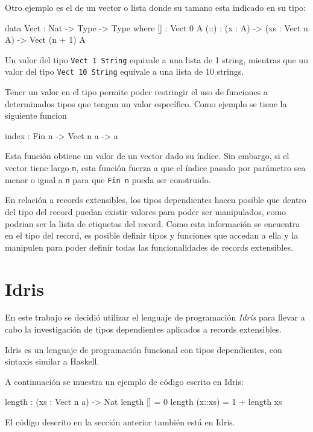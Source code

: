 Otro ejemplo es el de un vector o lista donde su tamano esta indicado en su tipo:

\begin{code}
data Vect : Nat -> Type -> Type where
  [] : Vect 0 A
  (::) : (x : A) -> (xs : Vect n A) -> Vect (n + 1) A
\end{code}

Un valor del tipo \texttt{Vect 1 String} equivale a una lista de 1 string, mientras que un valor del tipo \texttt{Vect 10 String} equivale a una lista de 10 strings.

Tener un valor en el tipo permite poder restringir el uso de funciones a determinados tipos que tengan un valor específico. Como ejemplo se tiene la siguiente funcion
\begin{code}
index : Fin n -> Vect n a -> a
\end{code}

Esta función obtiene un valor de un vector dado su índice. Sin embargo, si el vector tiene largo \texttt{n}, esta función fuerza a que el índice pasado por parámetro sea menor o igual a \texttt{n} para que \texttt{Fin n} pueda ser construido.

En relación a records extensibles, los tipos dependientes hacen posible que dentro del tipo del record puedan existir valores para poder ser manipulados, como podrian ser la lista de etiquetas del record. Como esta información se encuentra en el tipo del record, es posible definir tipos y funciones que accedan a ella y la manipulen para poder definir todas las funcionalidades de records extensibles.

\section{Idris}

En este trabajo se decidió utilizar el lenguaje de programación \textit{Idris} para llevar a cabo la investigación de tipos dependientes aplicados a records extensibles.

Idris es un lenguaje de programación funcional con tipos dependientes, con sintaxis similar a Haskell.

A continuación se muestra un ejemplo de código escrito en Idris:
\begin{code}
length : (xs : Vect n a) -> Nat
length [] = 0
length (x::xs) = 1 + length xs
\end{code}

El código descrito en la sección anterior también está en Idris.

